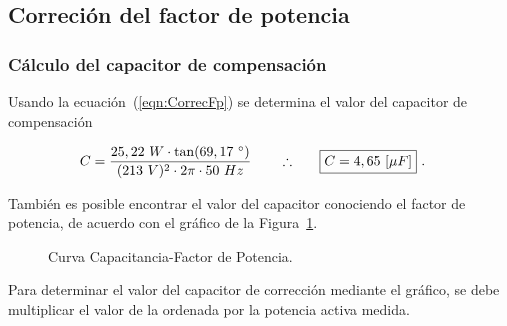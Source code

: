   \subsection{Correción del factor de potencia}
    \subsubsection{Cálculo del capacitor de compensación}
      
       Usando la ecuación~(\ref{eqn:CorrecFp}) se determina el valor del capacitor de compensación

      \begin{align*}
        C = \frac{25,22~W \cdot \tan(69,17~^{\circ} )}{(213~V)^2 \cdot 2  \pi \cdot 50~Hz }  \hspace{20pt} \therefore \hspace{20pt} \Aboxed{C = 4,65~[\mu F]}~.
      \end{align*}

        También es posible encontrar el valor del capacitor conociendo el factor de potencia, de acuerdo
        con el gráfico de la Figura~\ref{fig: Curva Cap_FDP}. 

        \begin{figure}[H]
          \centering
            \caption{Curva Capacitancia-Factor de Potencia.}
            \label{fig: Curva Cap_FDP}
        \end{figure}

        Para determinar el valor del capacitor de corrección mediante el gráfico, se debe 
        multiplicar el valor de la ordenada por la potencia activa medida.

